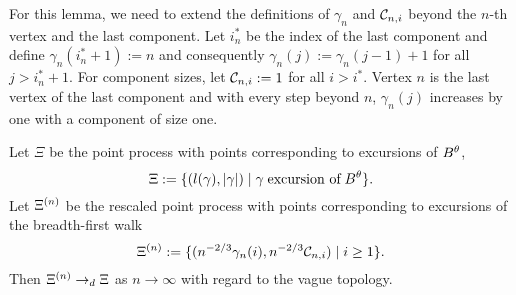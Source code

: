 For this lemma, we need to extend the definitions of $\gamma_n$ and $\mathcal{C}_{n,i}$ beyond the $n$-th vertex and the last component.
Let $i^*_n$ be the index of the last component 
and define $\gamma_n(i^*_n + 1) := n$ 
and consequently $\gamma_n(j) := \gamma_n(j-1) + 1$ for all $j > i^*_n + 1$.
For component sizes, let $\mathcal{C}_{n,i} := 1$ for all $i > i^*$.
Vertex $n$ is the last vertex of the last component and with every step beyond $n$, $\gamma_n(j)$ increases by one with a component of size one.


\begin{lemma} \label{L: Lemma 8}
	Let $\Xi$ be the point process with points corresponding to excursions of $B^{\theta}$,
	\begin{equation} \label{E: Lemma 8 def Xi}
	\Xi := \{ (l(\gamma), |\gamma|) \; | \; \gamma \; \text{excursion of} \; B^{\theta} \}.
	\end{equation}
	Let $\Xi^{(n)}$ be the rescaled point process with points corresponding to excursions of the breadth-first walk
	\begin{equation} \label{E: Lemma 8 def Xin}
	\Xi^{(n)} := \{ ( n^{-2 / 3} \gamma_n(i), n^{-2 / 3} \mathcal{C}_{n,i} ) \; | \; i \geq 1 \}.
	\end{equation}
	Then $\Xi^{(n)} \rightarrow_d \Xi$ as $n \rightarrow \infty$ with regard to the vague topology.
\end{lemma}

